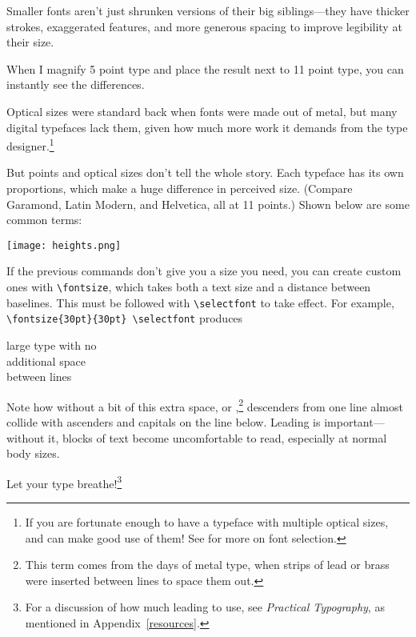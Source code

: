 Smaller fonts aren't just shrunken versions of their big siblings---they
have thicker strokes, exaggerated features,
and more generous spacing to improve legibility at their size.
\begin{leftfigure}
 When I magnify 5 point type
\lm and place the result next to 11 point type,
you can instantly see the differences.
\end{leftfigure}
Optical sizes were standard back when fonts were made out of metal,
but many digital typefaces lack them,
given how much more work it demands from the type
designer.\punckern\footnote{If you are fortunate enough to have
a typeface with multiple optical sizes, \LuaLaTeX{}
and \XeLaTeX{} can make good use of them! See 
for more on font selection.}

But points and optical sizes don't tell the whole story.
Each typeface has its own proportions, which make a huge difference
in perceived size.
(Compare Garamond, { Latin Modern},
and {Helvetica}, all at 11 points.)
Shown below are some common terms:
\begin{centerfigure}
\texttt{[image: heights.png]}

\end{centerfigure}

If the previous commands don't give you a size you need,
you can create custom ones with \verb|\fontsize|,
which takes both a text size and a
distance between baselines.
This must be followed with \verb|\selectfont| to take effect.
For example, \texttt{\textbackslash fontsize\{30pt\}\allowbreak\{30pt\}%
\allowbreak\textbackslash selectfont}
produces
\begin{leftfigure}
\lm
\fontsize{30pt}{30pt}\selectfont
large type with no \\
additional space \\
between lines
\end{leftfigure}
{\fontsize{11pt}{11pt}\selectfont
Note how without a bit of this extra space,
or ,\punckern\footnote{This term comes from the days of
metal type, when strips of lead or brass were inserted
between lines to space them out.}
descenders from one line almost collide with ascenders and capitals on
the line below.
Leading is important---without it, blocks of text become uncomfortable to
read, especially at normal body sizes.\par}
Let your type breathe!\footnote{For a discussion of how much leading
to use, see \textit{Practical Typography},
as mentioned in Appendix~\ref{resources}.}

